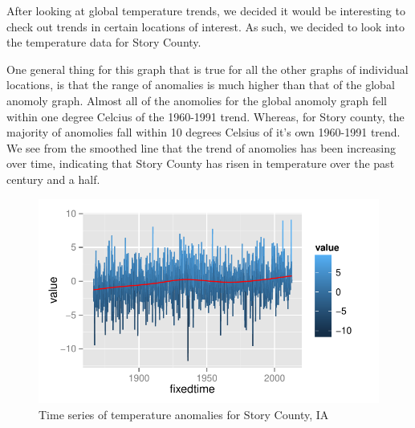 \documentclass{article}\usepackage{graphicx, color}
\newenvironment{knitrout}{}{} %
\begin{document}
After looking at global temperature trends, we decided it would be interesting to check out trends in certain locations of interest. As such, we decided to look into the temperature data for Story County.

One general thing for this graph that is true for all the other graphs of individual locations, is that the range of anomalies is much higher than that of the global anomoly graph. Almost all of the anomolies for the global anomoly graph fell within one degree Celcius of the 1960-1991 trend. Whereas, for Story county, the majority of anomolies fall within 10 degrees Celsius of it's own 1960-1991 trend. We see from the smoothed line that the trend of anomolies has been increasing over time, indicating that Story County has risen in temperature over the past century and a half.

\begin{figure}[H]
\begin{knitrout}
\color{fgcolor}\includegraphics[width=\linewidth]{figure/story-trend} 
\end{knitrout}

\caption{\label{storycount}Time series of temperature anomalies for Story County, IA}
\end{figure}
\end{document}
